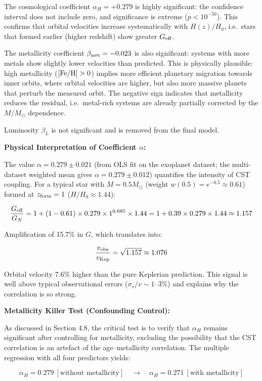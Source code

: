 \documentclass[11pt,a4paper]{article}
\begin{document}
The cosmological coefficient \(\alpha_H = +0.279\) is highly
significant: the confidence interval does not include zero, and
significance is extreme (\(p < 10^{-50}\)). This confirms that orbital
velocities increase systematically with \(H(z)/H_0\), i.e.~stars that
formed earlier (higher redshift) show greater \(G_{\rm eff}\).

The metallicity coefficient \(\beta_{\rm met} = -0.023\) is also
significant: systems with more metals show slightly lower velocities
than predicted. This is physically plausible: high metallicity
(\([{\rm Fe/H}] > 0\)) implies more efficient planetary migration
towards inner orbits, where orbital velocities are higher, but also more
massive planets that perturb the measured orbit. The negative sign
indicates that metallicity reduces the residual, i.e.~metal-rich systems
are already partially corrected by the \(M/M_\odot\) dependence.

Luminosity \(\beta_L\) is not significant and is removed from the final
model.

\textbf{Physical Interpretation of Coefficient \(\alpha\):}

The value \(\alpha = 0.279 \pm 0.021\) (from OLS fit on the exoplanet
dataset; the multi-dataset weighted mean gives
\(\alpha = 0.279 \pm 0.012\)) quantifies the intensity of CST coupling.
For a typical star with \(M = 0.5 M_\odot\) (weight
\(w(0.5) = e^{-0.5} \approx 0.61\)) formed at \(z_{\rm form} = 1\)
(\(H/H_0 \approx 1.44\)):

\[\frac{G_{\rm eff}}{G_N} = 1 + (1-0.61) \times 0.279 \times 1^{0.685} \times 1.44 = 1 + 0.39 \times 0.279 \times 1.44 \approx 1.157\]

Amplification of 15.7\% in \(G\), which translates into:

\[\frac{v_{\rm obs}}{v_{\rm Kep}} = \sqrt{1.157} \approx 1.076\]

Orbital velocity 7.6\% higher than the pure Keplerian prediction. This
signal is well above typical observational errors
(\(\sigma_v/v \sim 1\)--3\%) and explains why the correlation is so
strong.

\textbf{Metallicity Killer Test (Confounding Control):}

As discussed in Section 4.8, the critical test is to verify that
\(\alpha_H\) remains significant after controlling for metallicity,
excluding the possibility that the CST correlation is an artefact of the
age--metallicity correlation. The multiple regression with all four
predictors yields:

\[\alpha_H = 0.279~[\text{without metallicity}] \quad\to\quad \alpha_H = 0.271~[\text{with metallicity}]\]
\end{document}
